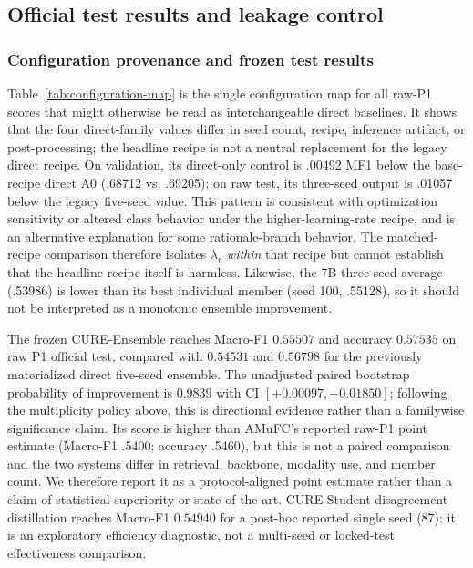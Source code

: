 \documentclass[11pt]{article}
\begin{document}
\subsection{Official test results and leakage control}\label{sec:canonical-test}
\subsubsection{Configuration provenance and frozen test results}
Table~\ref{tab:configuration-map} is the single configuration map for all raw-P1 scores that might otherwise be read as interchangeable direct baselines. It shows that the four direct-family values differ in seed count, recipe, inference artifact, or post-processing; the headline recipe is not a neutral replacement for the legacy direct recipe. On validation, its direct-only control is .00492 MF1 below the base-recipe direct A0 (.68712 vs. .69205); on raw test, its three-seed output is .01057 below the legacy five-seed value. This pattern is consistent with optimization sensitivity or altered class behavior under the higher-learning-rate recipe, and is an alternative explanation for some rationale-branch behavior. The matched-recipe comparison therefore isolates $\lambda_r$ \emph{within} that recipe but cannot establish that the headline recipe itself is harmless. Likewise, the 7B three-seed average (.53986) is lower than its best individual member (seed 100, .55128), so it should not be interpreted as a monotonic ensemble improvement.

The frozen CURE-Ensemble reaches Macro-F1 $0.55507$ and accuracy $0.57535$ on raw P1 official test, compared with $0.54531$ and $0.56798$ for the previously materialized direct five-seed ensemble. The unadjusted paired bootstrap probability of improvement is $0.9839$ with CI $[+0.00097,+0.01850]$; following the multiplicity policy above, this is directional evidence rather than a familywise significance claim. Its score is higher than AMuFC's reported raw-P1 point estimate (Macro-F1 .5400; accuracy .5460), but this is not a paired comparison and the two systems differ in retrieval, backbone, modality use, and member count. We therefore report it as a protocol-aligned point estimate rather than a claim of statistical superiority or state of the art. CURE-Student disagreement distillation reaches Macro-F1 $0.54940$ for a post-hoc reported single seed (87); it is an exploratory efficiency diagnostic, not a multi-seed or locked-test effectiveness comparison.
\end{document}
